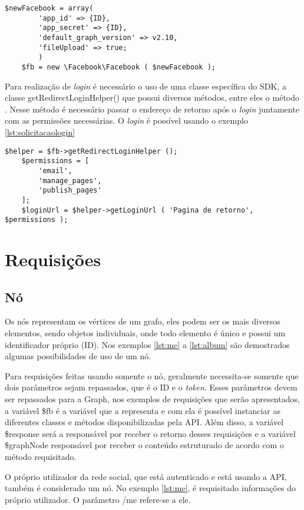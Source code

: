 \begin{lstlisting}[caption={Conexão entre aplicativo e SDK},label={lst:appesdk}]
	$newFacebook = array(
		'app_id' => {ID},
		'app_secret' => {ID},
		'default_graph_version' => v2.10,
		'fileUpload' => true;
		)
	$fb = new \Facebook\Facebook ( $newFacebook );
\end{lstlisting}

Para realização de \textit{login} é necessário o uso de uma classe específica do SDK, a classe getRedirectLoginHelper() que possui diversos métodos, entre eles o método . Nesse método é necessário passar o endereço de retorno após o \textit{login} juntamente com as permissões necessárias. O \textit{login} é possível usando o exemplo \ref{lst:solicitacaologin}

\begin{lstlisting}[caption={Solicitação de Login},label={lst:solicitacaologin}]
	$helper = $fb->getRedirectLoginHelper ();
	$permissions = [
		'email',
		'manage_pages',
		'publish_pages'
	];
	$loginUrl = $helper->getLoginUrl ( 'Pagina de retorno', $permissions );
\end{lstlisting}

\section{Requisições}
\subsection{Nó}
Os nós representam os vértices de um grafo, eles podem ser os mais diversos elementos, sendo objetos individuais, onde todo elemento é único e possui um identificador próprio (ID). Nos exemplos \ref{lst:me} a \ref{lst:album} são demostrados algumas possibilidades de uso de um nó.

Para requisições feitas usando somente o nó, geralmente necessita-se somente que dois parâmetros sejam repassados, que é o ID e o \textit{token}. Esses parâmetros devem ser repassados para a Graph, nos exemplos de requisições que serão apresentados, a variável \$fb é a variável que a representa e com ela é possível instanciar as diferentes classes e métodos disponibilizadas pela API. Além disso, a variável \$response será a responsável por receber o retorno desses requisições e a variável \$graphNode responsável por receber o conteúdo estruturado de acordo com o método requisitado.

O próprio utilizador da rede social, que está autenticado e está usando a API, também é considerado um nó. No exemplo \ref{lst:me}, é requisitado informações do próprio utilizador. O parâmetro /me refere-se a ele.

